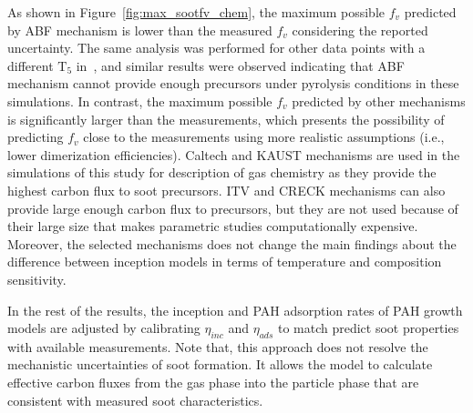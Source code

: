 As shown in Figure~\ref{fig:max_sootfv_chem}, the maximum possible $f_v$ predicted by ABF mechanism is lower than the measured $f_v$ considering the reported uncertainty. The same analysis was performed for other data points with a different $\mathrm{T_5}$ in~\citep{clack2025}, and similar results were observed indicating that ABF mechanism cannot provide enough precursors under pyrolysis conditions in these simulations. In contrast, the maximum possible $f_v$ predicted by other mechanisms is significantly larger than the measurements, which presents the possibility of predicting $f_v$ close to the measurements using more realistic assumptions (i.e., lower dimerization efficiencies). Caltech and KAUST mechanisms are used in the simulations of this study for description of gas chemistry as they provide the highest carbon flux to soot precursors. ITV and CRECK mechanisms can also provide large enough carbon flux to precursors, but they are not used because of their large size that makes parametric studies computationally expensive. Moreover, the selected mechanisms does not change the main findings about the difference between inception models in terms of temperature and composition sensitivity.

In the rest of the results, the inception and PAH adsorption rates of PAH growth models are adjusted by calibrating $\eta_{inc}$ and $\eta_{ads}$ to match predict soot properties with available measurements. Note that, this approach does not resolve the mechanistic uncertainties of soot formation. It allows the model to calculate effective carbon fluxes from the gas phase into the particle phase that are consistent with measured soot characteristics.